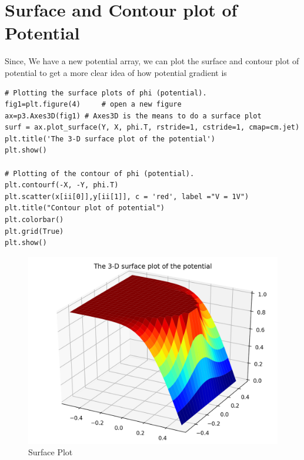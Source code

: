 \documentclass[12pt, a4paper]{report}
\begin{document}
\section*{Surface and Contour plot of Potential}
Since, We have a new potential array, we can plot the surface and contour plot of potential to get a more clear idea of how potential gradient is 
\begin{Verbatim}
# Plotting the surface plots of phi (potential).
fig1=plt.figure(4)     # open a new figure
ax=p3.Axes3D(fig1) # Axes3D is the means to do a surface plot
surf = ax.plot_surface(Y, X, phi.T, rstride=1, cstride=1, cmap=cm.jet)
plt.title('The 3-D surface plot of the potential')
plt.show()

# Plotting of the contour of phi (potential).
plt.contourf(-X, -Y, phi.T)
plt.scatter(x[ii[0]],y[ii[1]], c = 'red', label ="V = 1V")
plt.title("Contour plot of potential")
plt.colorbar()
plt.grid(True)
plt.show()
\end{Verbatim}


\begin{figure}[!tbh]
   	\centering
   	\includegraphics[scale=0.75]{Q4.png}
	\caption{Surface Plot}
   	\label{fig:allgraphs}
 \end{figure} 
\end{document}
